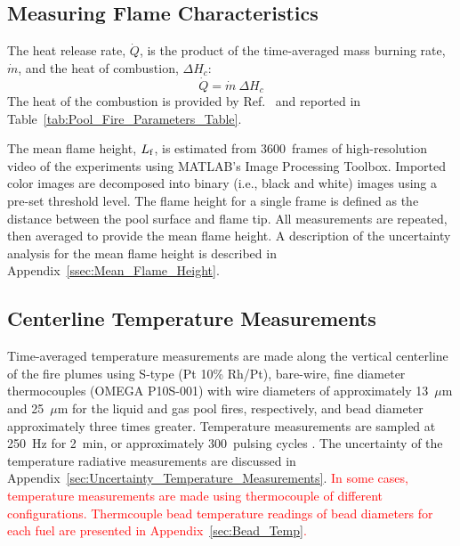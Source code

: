 \documentclass[12pt]{article}
\begin{document}
\subsection{Measuring Flame Characteristics}
\label{ssec:Flame_Characteristics_Measurements}

The heat release rate, $\dot{Q}$, is the product of the time-averaged mass burning rate, $\dot{m}$, and the heat of combustion, $\Delta H_{c}$:
\begin{equation}\label{eq:Heat_release_rate}
\dot{Q}= \dot{m}~\Delta H_{c}
\end{equation}
The heat of the combustion is provided by Ref.~\cite{Dippr} and reported in Table~\ref{tab:Pool_Fire_Parameters_Table}.

The mean flame height, $L_{\rm{f}}$, is estimated from 3600~frames of high-resolution video of the experiments using MATLAB’s Image Processing Toolbox. Imported color images are decomposed into binary (i.e., black and white) images using a pre-set threshold level. The flame height for a single frame is defined as the distance between the pool surface and flame tip. All measurements are repeated, then averaged to provide the mean flame height. A description of the uncertainty analysis for the mean flame height is described in Appendix~\ref{ssec:Mean_Flame_Height}.

\subsection{Centerline Temperature Measurements}
\label{ssec:Temperature_Measurements}

Time-averaged temperature measurements are made along the vertical centerline of the fire plumes using S-type (Pt 10\% Rh/Pt), bare-wire, fine diameter thermocouples (OMEGA P10S-001) with wire diameters of approximately 13~$\mu$m and 25~$\mu$m for the liquid and gas pool fires, respectively, and bead diameter approximately three times greater. Temperature measurements are sampled at \SI{250}{Hz} for \SI{2}{min}, or approximately 300~pulsing cycles \cite{Wang2019}. The uncertainty of the temperature radiative measurements are discussed in Appendix~\ref{sec:Uncertainty_Temperature_Measurements}. \textcolor{red}{In some cases, temperature measurements are made using thermocouple of different configurations. Thermcouple bead temperature readings of bead diameters for each fuel are presented in Appendix~\ref{sec:Bead_Temp}.}
\end{document}
